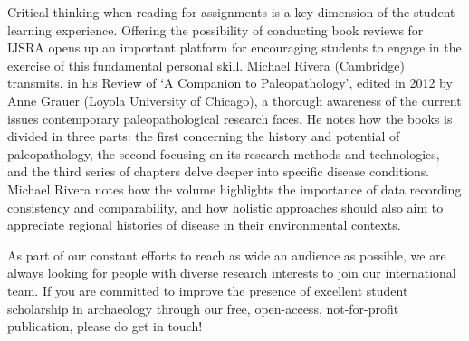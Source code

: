 Critical thinking when reading for assignments is a key dimension of the student learning experience. Offering the possibility of conducting book reviews for IJSRA opens up an important platform for encouraging students to engage in the exercise of this fundamental personal skill. Michael Rivera (Cambridge) transmits, in his Review of ‘A Companion to Paleopathology’, edited in 2012 by Anne Grauer (Loyola University of Chicago), a thorough awareness of the current issues contemporary paleopathological research faces. He notes how the books is divided in three parts: the first concerning the history and potential of paleopathology, the second focusing on its research methods and technologies, and the third series of chapters delve deeper into specific disease conditions. Michael Rivera notes how the volume highlights the importance of data recording consistency and comparability, and how holistic approaches should also aim to appreciate regional histories of disease in their environmental contexts.

\IJSRAseparator
As part of our constant efforts to reach as wide an audience as possible, we are always looking for people with diverse research interests to join our international team. If you are committed to improve the presence of excellent student scholarship in archaeology through our free, open-access, not-for-profit publication, please do get in touch!
\IJSRAclosing%